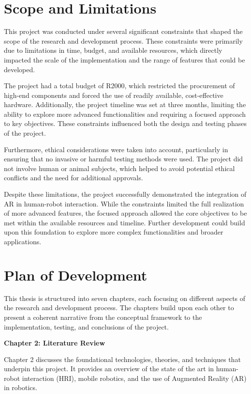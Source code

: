 \section{\label{sec:scope}Scope and Limitations}

This project was conducted under several significant constraints that shaped the scope of the research and development process. These constraints were primarily due to limitations in time, budget, and available resources, which directly impacted the scale of the implementation and the range of features that could be developed.

The project had a total budget of R2000, which restricted the procurement of high-end components and forced the use of readily available, cost-effective hardware. Additionally, the project timeline was set at three months, limiting the ability to explore more advanced functionalities and requiring a focused approach to key objectives. These constraints influenced both the design and testing phases of the project.

Furthermore, ethical considerations were taken into account, particularly in ensuring that no invasive or harmful testing methods were used. The project did not involve human or animal subjects, which helped to avoid potential ethical conflicts and the need for additional approvals.

Despite these limitations, the project successfully demonstrated the integration of AR in human-robot interaction. While the constraints limited the full realization of more advanced features, the focused approach allowed the core objectives to be met within the available resources and timeline. Further development could build upon this foundation to explore more complex functionalities and broader applications.


\section{\label{sec:plan_of_development}Plan of Development}

This thesis is structured into seven chapters, each focusing on different aspects of the research and development process. The chapters build upon each other to present a coherent narrative from the conceptual framework to the implementation, testing, and conclusions of the project.

\textbf{Chapter 2: Literature Review}

Chapter 2 discusses the foundational technologies, theories, and techniques that underpin this project. It provides an overview of the state of the art in human-robot interaction (HRI), mobile robotics, and the use of Augmented Reality (AR) in robotics. 

